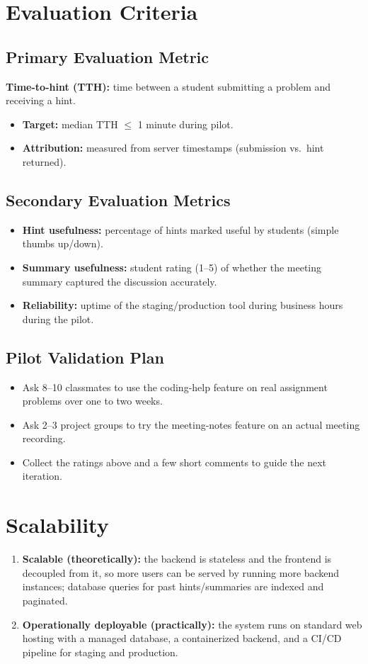 \documentclass[11pt]{article}
\begin{document}
\section{Evaluation Criteria}

\subsection{Primary Evaluation Metric}
\textbf{Time-to-hint (TTH):} time between a student submitting a problem and receiving a hint.
\begin{itemize}
    \item \textbf{Target:} median TTH $\leq$ 1 minute during pilot.
    \item \textbf{Attribution:} measured from server timestamps (submission vs.\ hint returned).
\end{itemize}

\subsection{Secondary Evaluation Metrics}
\begin{itemize}
    \item \textbf{Hint usefulness:} percentage of hints marked useful by students (simple thumbs up/down).
    \item \textbf{Summary usefulness:} student rating (1--5) of whether the meeting summary captured the discussion accurately.
    \item \textbf{Reliability:} uptime of the staging/production tool during business hours during the pilot.
\end{itemize}

\subsection{Pilot Validation Plan}
\begin{itemize}
    \item Ask 8--10 classmates to use the coding-help feature on real assignment problems over one to two weeks.
    \item Ask 2--3 project groups to try the meeting-notes feature on an actual meeting recording.
    \item Collect the ratings above and a few short comments to guide the next iteration.
\end{itemize}

\section{Scalability}
\begin{enumerate}
    \item \textbf{Scalable (theoretically):} the backend is stateless and the frontend is decoupled from it, so more users can be served by running more backend instances; database queries for past hints/summaries are indexed and paginated.
    \item \textbf{Operationally deployable (practically):} the system runs on standard web hosting with a managed database, a containerized backend, and a CI/CD pipeline for staging and production.
\end{enumerate}
\end{document}
